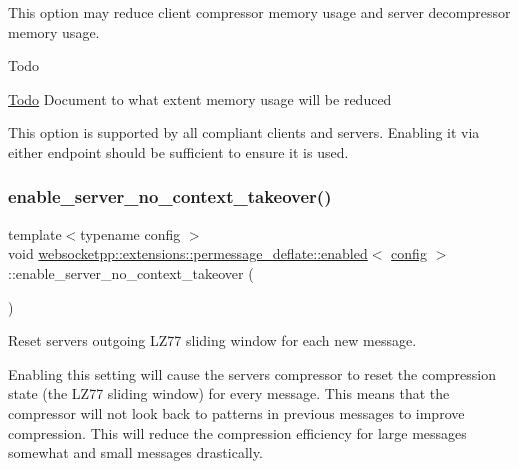 This option may reduce client compressor memory usage and server decompressor memory usage. \begin{DoxyRefDesc}{Todo}
\item[\mbox{\hyperlink{todo__todo000013}{Todo}}]Document to what extent memory usage will be reduced\end{DoxyRefDesc}


This option is supported by all compliant clients and servers. Enabling it via either endpoint should be sufficient to ensure it is used. \mbox{\label{classwebsocketpp_1_1extensions_1_1permessage__deflate_1_1enabled_a9275c22cfd6782ef72a722168d663d8b}} 
\subsubsection{\texorpdfstring{enable\+\_\+server\+\_\+no\+\_\+context\+\_\+takeover()}{enable\_server\_no\_context\_takeover()}}
{\footnotesize\ttfamily template$<$typename config $>$ \\
void \mbox{\hyperlink{classwebsocketpp_1_1extensions_1_1permessage__deflate_1_1enabled}{websocketpp\+::extensions\+::permessage\+\_\+deflate\+::enabled}}$<$ \mbox{\hyperlink{classconfig}{config}} $>$\+::enable\+\_\+server\+\_\+no\+\_\+context\+\_\+takeover (\begin{DoxyParamCaption}{ }\end{DoxyParamCaption})\hspace{0.3cm}{\ttfamily [inline]}}



Reset server\textquotesingle{}s outgoing L\+Z77 sliding window for each new message. 

Enabling this setting will cause the server\textquotesingle{}s compressor to reset the compression state (the L\+Z77 sliding window) for every message. This means that the compressor will not look back to patterns in previous messages to improve compression. This will reduce the compression efficiency for large messages somewhat and small messages drastically.

